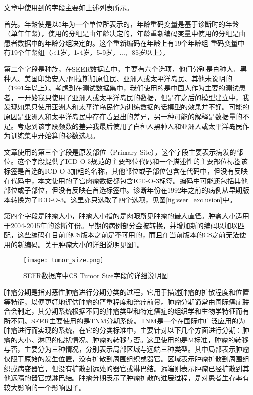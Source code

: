文章中使用到的字段主要如上述列表所示。

首先，年龄使是以5年为一个单位所表示的，年龄重码变量是基于诊断时的年龄（单年年龄），使用的分组是由年龄决定的，年龄重新编码变量中使用的分组是由患者数据中的年龄分组决定的。这个重新编码在年龄上有19个年龄组 重码变量中有19个年龄组（<1岁，1-4岁，5-9岁，...，85岁以上）。

第二个字段是种族，在SEER数据库中，主要有六个选项，他们分别是白种人、黑种人、美国印第安人/阿拉斯加原住民、亚洲人或太平洋岛民、其他未说明的（1991年以上）。考虑到在测试数据集中，我们使用的是中国人作为主要的测试患者，一开始我只使用了亚洲人或太平洋岛民的数据，但是在之后的模型建立中，我发现如果只使用亚洲人和太平洋岛民作为训练数据的话模型的效果并不好。可能的原因是亚洲人和太平洋岛民中存在着显出的差异，另一种可能的解释是数据量的不足。考虑到该字段频数的差异我最后使用了白种人黑种人和亚洲人或太平洋岛民作为训练集中开始算的参数选项。

文章使用的第三个字段是原发部位（Primary Site），这个字段主要表示病发的部位。这个字段提供了ICD-O-3规范的主要部位代码和一个描述性的主要部位标签该标签是首选的ICD-O-3加粗的名称，其他部位或子部位包含在代码中，但没有反映在代码中，本文使用的子宫肉瘤数据都包含ICD-O-3标签。编码中可能还包括其他部位或子部位，但没有反映在首选标签中。诊断年份在1992年之前的病例从早期版本转换为了ICD-O-3。这里亦只选取了四个选项，见图\ref{fig:seer_exclusion}中。

第四个字段是肿瘤大小，肿瘤大小指的是肉眼所见肿瘤的最大直径。肿瘤大小适用于2004-2015年的诊断年份。早期的病例部分会被转换，并增加新的编码以加以匹配，这些编码在目前的CS版本之前是不可用的，而且在当前版本的CS之前无法使用的新编码。关于肿瘤大小的详细说明见图\ref{fig:tumor_size}。

\begin{figure}[!htbp]
    \centering
    \texttt{[image: tumor\_size.png]}
    \caption{SEER数据库中CS Tumor Size字段的详细说明图} \label{fig:tumor_size}
\end{figure}

肿瘤分期是指对恶性肿瘤进行分期分类的过程，它用于描述肿瘤的扩散程度和位置等特征，以便更好地评估肿瘤的严重程度和治疗前景。肿瘤分期通常由国际癌症联合会制定，其分期系统根据不同的肿瘤类型和特定癌症的组织学和生物学特征而有所不同。SEER主要使用的是TNM分期系统。TNM是一个在国际中广泛应用的为肿瘤进行而实现的系统，在它的分类标准中，主要针对以下几个方面进行分期：肿瘤的大小、淋巴的侵扰情况、肿瘤的转移与否。这里使用的是M标准，肿瘤的转移与否，主要分为三种情况，分别表示局部区域与远端三种类型。其中局部表示肿瘤仅限于原始的发生位置，没有扩散到周围组织或器官。区域表示肿瘤扩散到周围组织或病变器官，但没有扩散到远处的器官或淋巴结。远端则表示肿瘤已经扩散到其他远隔的器官或淋巴结。肿瘤分期表示了肿瘤扩散的进展过程，是对患者生存率有较大影响的一个影响因子。

